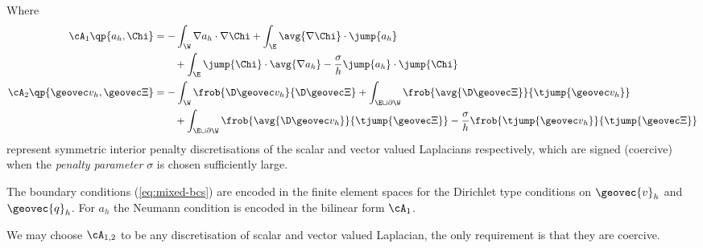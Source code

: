 \documentclass[final]{amsart}
\numberwithin{equation}{section}
\begin{document}
Where 
\begin{equation}
  \begin{split}
    \cA_1\qp{a_h, \Chi}
    &=
    -\int_\W 
    \nabla a_h \cdot \nabla \Chi
    + 
    \int_{\E} \avg{\nabla \Chi} \cdot \jump{a_h}
    \\
    & \qquad +
    \int_\E \jump{\Chi}\cdot \avg{\nabla a_h}
    -
    \frac{\sigma}{h} \jump{a_h} \cdot \jump{\Chi}
    \\
    \cA_2\qp{\geovec v_h, \geovec \Xi}
    &=
    -\int_\W 
    \frob{\D \geovec v_h}{\D \geovec \Xi}
    +
    \int_{\E\cup\partial\W} 
    \frob{\avg{\D \geovec \Xi}}{\tjump{\geovec v_h}}
    \\
    &\qquad +
    \int_{\E\cup\partial\W} 
    \frob{\avg{\D \geovec v_h}}{\tjump{\geovec \Xi}}
    -
    \frac{\sigma}{h}\frob{\tjump{\geovec v_h}}{\tjump{\geovec \Xi}}
  \end{split}
\end{equation}
represent symmetric interior penalty discretisations of the scalar and
vector valued Laplacians respectively, which are signed (coercive)
when the \emph{penalty parameter} $\sigma$ is chosen sufficiently
large.

\begin{Rem}
  The boundary conditions (\ref{eq:mixed-bcs}) are encoded in the
  finite element spaces for the Dirichlet type conditions on ${\geovec{v}}_h$ and ${\geovec{q}}_h$. For $a_h$ the Neumann condition is encoded in
  the bilinear form $\cA_1$.
\end{Rem}

\begin{Rem}
  We may choose $\cA_{1,2}$ to be any discretisation of scalar and
  vector valued Laplacian, the only requirement is that they are
  coercive.
\end{Rem}
\end{document}
